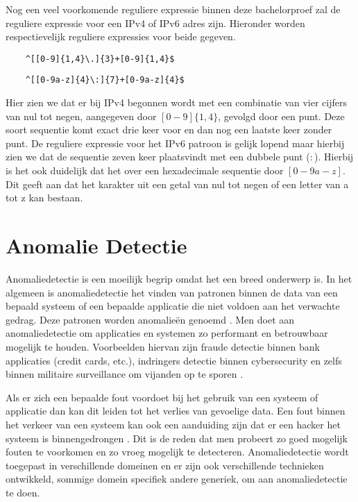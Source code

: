 Nog een veel voorkomende reguliere expressie binnen deze bachelorproef zal de reguliere expressie voor een IPv4 of IPv6 adres zijn. Hieronder worden respectievelijk reguliere expressies voor beide gegeven.
\begin{verbatim}
    ^[[0-9]{1,4}\.]{3}+[0-9]{1,4}$
\end{verbatim}
\begin{verbatim}
    ^[[0-9a-z]{4}\:]{7}+[0-9a-z]{4}$
\end{verbatim}
Hier zien we dat er bij IPv4 begonnen wordt met een combinatie van vier cijfers van nul tot negen, aangegeven door \([0-9]\{1,4\}\), gevolgd door een punt. Deze soort sequentie komt exact drie keer voor en dan nog een laatste keer zonder punt. De reguliere expressie voor het IPv6 patroon is gelijk lopend maar hierbij zien we dat de sequentie zeven keer plaatsvindt met een dubbele punt (\(:\)). Hierbij is het ook duidelijk dat het over een hexadecimale sequentie door \([0-9a-z]\). Dit geeft aan dat het karakter uit een getal van nul tot negen of een letter van a tot z kan bestaan.

\section{Anomalie Detectie}

Anomaliedetectie is een moeilijk begrip omdat het een breed onderwerp is. In het algemeen is anomaliedetectie het vinden van patronen binnen de data van een bepaald systeem of een bepaalde applicatie die niet voldoen aan het verwachte gedrag. Deze patronen worden anomalieën genoemd \autocite{chandola2009anomaly}. Men doet aan anomaliedetectie om applicaties en systemen zo performant en betrouwbaar mogelijk te houden. Voorbeelden hiervan zijn fraude detectie binnen bank applicaties (credit cards, etc.), indringers detectie binnen cybersecurity en zelfs binnen militaire surveillance om vijanden op te sporen \autocite{chandola2009anomaly}. 

Als er zich een bepaalde fout voordoet bij het gebruik van een systeem of applicatie dan kan dit leiden tot het verlies van gevoelige data. Een fout binnen het verkeer van een systeem kan ook een aanduiding zijn dat er een hacker het systeem is binnengedrongen \autocite{chandola2009anomaly}. Dit is de reden dat men probeert zo goed mogelijk fouten te voorkomen en zo vroeg mogelijk te detecteren. Anomaliedetectie wordt toegepast in verschillende domeinen en er zijn ook verschillende technieken ontwikkeld, sommige domein specifiek andere generiek, om aan anomaliedetectie te doen. 

